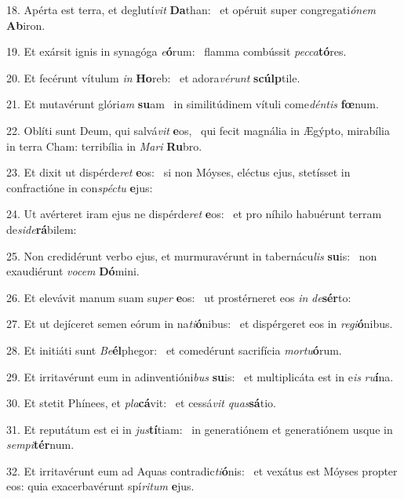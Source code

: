 18. Apérta est terra, et deglutí\textit{vit} \textbf{Da}than: \ast\  et opéruit super congregati\textit{ó}\textit{nem} \textbf{Ab}iron.\

19. Et exársit ignis in synagóga \textit{e}\textbf{ó}rum: \ast\  flamma combússit \textit{pec}\textit{ca}\textbf{tó}res.\

20. Et fecérunt vítulum \textit{in} \textbf{Ho}reb: \ast\  et adora\textit{vé}\textit{runt} \textbf{scúlp}tile.\

21. Et mutavérunt glóri\textit{am} \textbf{su}am \ast\  in similitúdinem vítuli come\textit{dén}\textit{tis} \textbf{fœ}num.\

22. Oblíti sunt Deum, qui salvá\textit{vit} \textbf{e}os, \ast\  qui fecit magnália in Ægýpto, mirabília in terra Cham: terribília in \textit{Ma}\textit{ri} \textbf{Ru}bro.\

23. Et dixit ut dispérde\textit{ret} \textbf{e}os: \ast\  si non Móyses, eléctus ejus, stetísset in confractióne in con\textit{spéc}\textit{tu} \textbf{e}jus:\

24. Ut avérteret iram ejus ne dispérde\textit{ret} \textbf{e}os: \ast\  et pro níhilo habuérunt terram de\textit{si}\textit{de}\textbf{rá}bilem:\

25. Non credidérunt verbo ejus, et murmuravérunt in tabernácu\textit{lis} \textbf{su}is: \ast\  non exaudiérunt \textit{vo}\textit{cem} \textbf{Dó}mini.\

26. Et elevávit manum suam su\textit{per} \textbf{e}os: \ast\  ut prostérneret eos \textit{in} \textit{de}\textbf{sér}to:\

27. Et ut dejíceret semen eórum in na\textit{ti}\textbf{ó}nibus: \ast\  et dispérgeret eos in \textit{re}\textit{gi}\textbf{ó}nibus.\

28. Et initiáti sunt \textit{Be}\textbf{él}phegor: \ast\  et comedérunt sacrifícia \textit{mor}\textit{tu}\textbf{ó}rum.\

29. Et irritavérunt eum in adinventióni\textit{bus} \textbf{su}is: \ast\  et multiplicáta est in e\textit{is} \textit{ru}\textbf{í}na.\

30. Et stetit Phínees, et \textit{pla}\textbf{cá}vit: \ast\  et cessá\textit{vit} \textit{quas}\textbf{sá}tio.\

31. Et reputátum est ei in \textit{jus}\textbf{tí}tiam: \ast\  in generatiónem et generatiónem usque in \textit{sem}\textit{pi}\textbf{tér}num.\

32. Et irritavérunt eum ad Aquas contradic\textit{ti}\textbf{ó}nis: \ast\  et vexátus est Móyses propter eos: quia exacerbavérunt spí\textit{ri}\textit{tum} \textbf{e}jus.\

